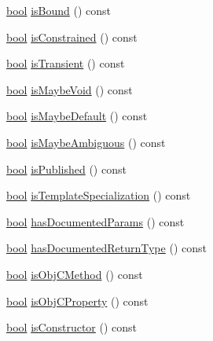 \begin{DoxyCompactItemize}
\hyperlink{qglobal_8h_a1062901a7428fdd9c7f180f5e01ea056}{bool} \hyperlink{class_member_def_a494e4e505e2c26eb17f6769b1f708fbd}{is\+Bound} () const 
\item 
\hyperlink{qglobal_8h_a1062901a7428fdd9c7f180f5e01ea056}{bool} \hyperlink{class_member_def_a563d31242cd344a3d313e8b36d34baf3}{is\+Constrained} () const 
\item 
\hyperlink{qglobal_8h_a1062901a7428fdd9c7f180f5e01ea056}{bool} \hyperlink{class_member_def_adff5d1e727ebde23a98aeb6540d3c567}{is\+Transient} () const 
\item 
\hyperlink{qglobal_8h_a1062901a7428fdd9c7f180f5e01ea056}{bool} \hyperlink{class_member_def_aae09cac0b230d4adc2905a93a60d1210}{is\+Maybe\+Void} () const 
\item 
\hyperlink{qglobal_8h_a1062901a7428fdd9c7f180f5e01ea056}{bool} \hyperlink{class_member_def_a35c408ceb26c722a19c7499fda6e53d2}{is\+Maybe\+Default} () const 
\item 
\hyperlink{qglobal_8h_a1062901a7428fdd9c7f180f5e01ea056}{bool} \hyperlink{class_member_def_a91032feb2eab69022384e7dbbb4ba66b}{is\+Maybe\+Ambiguous} () const 
\item 
\hyperlink{qglobal_8h_a1062901a7428fdd9c7f180f5e01ea056}{bool} \hyperlink{class_member_def_ad4a57c820b97d8c313f2678e42073ba8}{is\+Published} () const 
\item 
\hyperlink{qglobal_8h_a1062901a7428fdd9c7f180f5e01ea056}{bool} \hyperlink{class_member_def_a279fafe31722b89bd93d859aadd102a3}{is\+Template\+Specialization} () const 
\item 
\hyperlink{qglobal_8h_a1062901a7428fdd9c7f180f5e01ea056}{bool} \hyperlink{class_member_def_af480505a6fd8e37b104bf2e988296b95}{has\+Documented\+Params} () const 
\item 
\hyperlink{qglobal_8h_a1062901a7428fdd9c7f180f5e01ea056}{bool} \hyperlink{class_member_def_a009d8ce58deac5d2f40c878e745005e4}{has\+Documented\+Return\+Type} () const 
\item 
\hyperlink{qglobal_8h_a1062901a7428fdd9c7f180f5e01ea056}{bool} \hyperlink{class_member_def_ae108b1b765557f04d443c91818688a13}{is\+Obj\+C\+Method} () const 
\item 
\hyperlink{qglobal_8h_a1062901a7428fdd9c7f180f5e01ea056}{bool} \hyperlink{class_member_def_a648c39652e3929e1e8af8f7d3e57ee31}{is\+Obj\+C\+Property} () const 
\item 
\hyperlink{qglobal_8h_a1062901a7428fdd9c7f180f5e01ea056}{bool} \hyperlink{class_member_def_ae1e599695924c68adc3f8bb821539245}{is\+Constructor} () const 
\item 

\end{DoxyCompactItemize}
